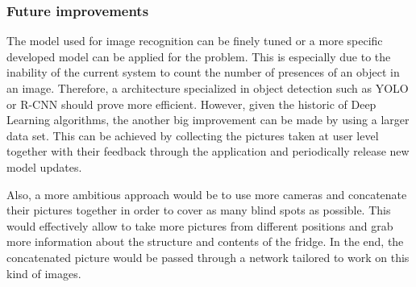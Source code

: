 \documentclass[a4paper,11pt]{article}
\begin{document}
	   \subsubsection{Future improvements}
	   
	   The model used for image recognition can
	   be finely tuned or a more specific developed model can be
	   applied for the problem. This is especially due to the inability of the current system to count the number of presences of an object in an image. Therefore, a architecture specialized in object detection such as YOLO or R-CNN should prove more efficient. However, given the historic of
	   Deep Learning algorithms, the another big improvement can
	   be made by using a larger data set. This can be achieved
	   by collecting the pictures taken at user level together with
	   their feedback through the application and periodically
	   release new model updates. 
	   
	   Also, a more  ambitious approach would be to use more cameras and concatenate their pictures together in order to cover as many blind spots as possible. This would effectively allow to take more pictures from different positions and grab more information about the structure and contents of the fridge. In the end, the concatenated picture would be passed through a network tailored to work on this kind of images.
  
\newpage


\end{document}
